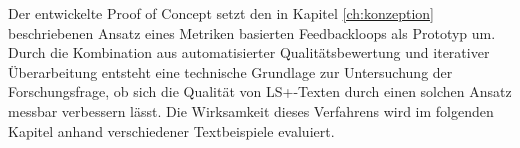 
Der entwickelte Proof of Concept setzt den in Kapitel \ref{ch:konzeption} beschriebenen Ansatz eines Metriken basierten Feedbackloops als Prototyp um.
Durch die Kombination aus automatisierter Qualitätsbewertung und iterativer Überarbeitung entsteht eine technische Grundlage zur Untersuchung der Forschungsfrage, ob sich die Qualität von LS+-Texten durch einen solchen Ansatz messbar verbessern lässt.
Die Wirksamkeit dieses Verfahrens wird im folgenden Kapitel anhand verschiedener Textbeispiele evaluiert.